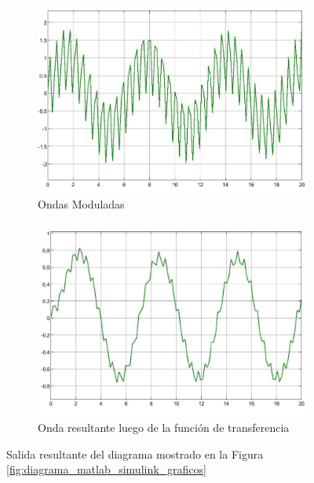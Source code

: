 \begin{figure}[htbp]
    \centering
    \begin{subfigure}[b]{0.45\textwidth}
        \centering
        \includegraphics[width=\textwidth]{fig/especifico_2/onda_modulada.pdf}
        \caption{Ondas Moduladas}
        \label{fig:onda_modulada_zedboard}
    \end{subfigure}
    \hfill
    \begin{subfigure}[b]{0.45\textwidth}
        \centering
        \includegraphics[width=\textwidth]{fig/especifico_2/onda_filtrada.pdf}
        \caption{Onda resultante luego de la función de transferencia}
        \label{fig:onda_filtrada_zedboard}
    \end{subfigure}
    \caption{Salida resultante del diagrama mostrado en la Figura \ref{fig:diagrama_matlab_simulink_graficos}}
    \label{fig:salida_resultante_diagrama_graficos_zedboard}
\end{figure}

